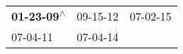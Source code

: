 \begin{supertabular}{lll}
 \textbf{01-23-09\textsuperscript{$\wedge$}} &  09-15-12\textsuperscript{} &  07-02-15\textsuperscript{} \\
                  07-04-11\textsuperscript{} &  07-04-14\textsuperscript{} &                             \\
\end{supertabular}

